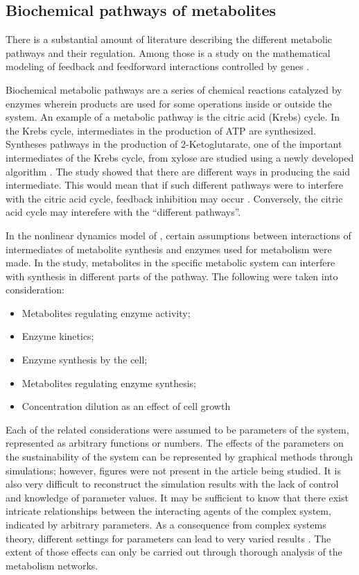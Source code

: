 \subsection{Biochemical pathways of metabolites}

There is a substantial amount of literature describing the different metabolic pathways and their regulation.
Among those is a study on the mathematical modeling of feedback and feedforward interactions controlled by genes \cite{Chaves2019}.

Biochemical metabolic pathways are a series of chemical reactions catalyzed by enzymes wherein products are used for some operations inside or outside the system.
An example of a metabolic pathway is the citric acid (Krebs) cycle.
In the Krebs cycle, intermediates in the production of ATP are synthesized.
Syntheses pathways in the production of 2-Ketoglutarate, one of the important intermediates of the Krebs cycle, from xylose are studied using a newly developed algorithm \cite{Gupta2018}.
The study showed that there are different ways in producing the said intermediate.
This would mean that if such different pathways were to interfere with the citric acid cycle, feedback inhibition may occur \cite{Chaves2019}.
Conversely, the citric acid cycle may interefere with the ``different pathways''.

In the nonlinear dynamics model of , certain assumptions between interactions of intermediates of metabolite synthesis and enzymes used for metabolism were made.
In the study, metabolites in the specific metabolic system can interfere with synthesis in different parts of the pathway.
The following were taken into consideration:

\begin{itemize}
    \item Metabolites regulating enzyme activity;
    \item Enzyme kinetics;
    \item Enzyme synthesis by the cell;
    \item Metabolites regulating enzyme synthesis;
    \item Concentration dilution as an effect of cell growth
\end{itemize}

Each of the related considerations were assumed to be parameters of the system, represented as arbitrary functions or numbers.
The effects of the parameters on the sustainability of the system can be represented by graphical methods through simulations; however, figures were not present in the article being studied.
It is also very difficult to reconstruct the simulation results with the lack of control and knowledge of parameter values.
It may be sufficient to know that there exist intricate relationships between the interacting agents of the complex system, indicated by arbitrary parameters.
As a consequence from complex systems theory, different settings for parameters can lead to very varied results \cite{Devaney}. 
The extent of those effects can only be carried out through thorough analysis of the metabolism networks.   

